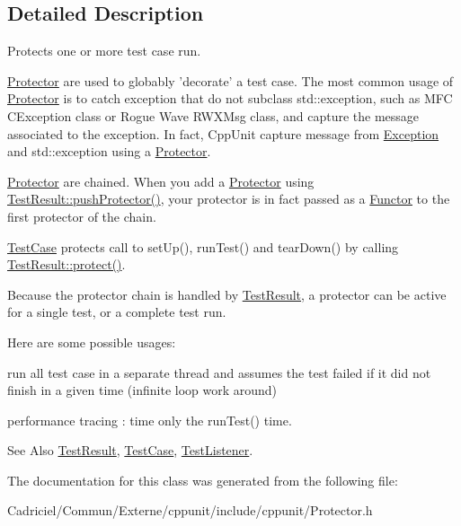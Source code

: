 \subsection{Detailed Description}
Protects one or more test case run. 

\hyperlink{class_protector}{Protector} are used to globably 'decorate' a test case. The most common usage of \hyperlink{class_protector}{Protector} is to catch exception that do not subclass std\-::exception, such as M\-F\-C C\-Exception class or Rogue Wave R\-W\-X\-Msg class, and capture the message associated to the exception. In fact, Cpp\-Unit capture message from \hyperlink{class_exception}{Exception} and std\-::exception using a \hyperlink{class_protector}{Protector}.

\hyperlink{class_protector}{Protector} are chained. When you add a \hyperlink{class_protector}{Protector} using \hyperlink{class_test_result_a1a4fbbca38cb73e8e00905193b7593dc}{Test\-Result\-::push\-Protector()}, your protector is in fact passed as a \hyperlink{class_functor}{Functor} to the first protector of the chain.

\hyperlink{class_test_case}{Test\-Case} protects call to set\-Up(), run\-Test() and tear\-Down() by calling \hyperlink{class_test_result_a243b3097a3d9468abc61e7910bbaa8b7}{Test\-Result\-::protect()}.

Because the protector chain is handled by \hyperlink{class_test_result}{Test\-Result}, a protector can be active for a single test, or a complete test run.

Here are some possible usages\-:
\begin{DoxyItemize}
\item run all test case in a separate thread and assumes the test failed if it did not finish in a given time (infinite loop work around)
\item performance tracing \-: time only the run\-Test() time. \begin{DoxySeeAlso}{See Also}
\hyperlink{class_test_result}{Test\-Result}, \hyperlink{class_test_case}{Test\-Case}, \hyperlink{class_test_listener}{Test\-Listener}. 
\end{DoxySeeAlso}

\end{DoxyItemize}

The documentation for this class was generated from the following file\-:\begin{DoxyCompactItemize}
\item 
Cadriciel/\-Commun/\-Externe/cppunit/include/cppunit/Protector.\-h\end{DoxyCompactItemize}
